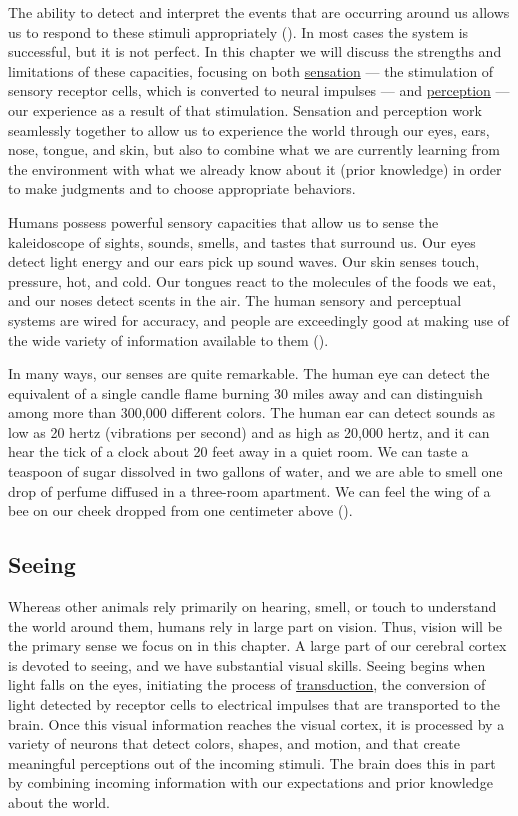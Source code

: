 \documentclass[
]{krantz}
\begin{document}
The ability to detect and interpret the events that are occurring around us allows us to respond to these stimuli appropriately (). In most cases the system is successful, but it is not perfect. In this chapter we will discuss the strengths and limitations of these capacities, focusing on both \hyperref[sensation]{sensation} --- the stimulation of sensory receptor cells, which is converted to neural impulses --- and \hyperref[perception]{perception} --- our experience as a result of that stimulation. Sensation and perception work seamlessly together to allow us to experience the world through our eyes, ears, nose, tongue, and skin, but also to combine what we are currently learning from the environment with what we already know about it (prior knowledge) in order to make judgments and to choose appropriate behaviors.

Humans possess powerful sensory capacities that allow us to sense the kaleidoscope of sights, sounds, smells, and tastes that surround us. Our eyes detect light energy and our ears pick up sound waves. Our skin senses touch, pressure, hot, and cold. Our tongues react to the molecules of the foods we eat, and our noses detect scents in the air. The human sensory and perceptual systems are wired for accuracy, and people are exceedingly good at making use of the wide variety of information available to them ().

In many ways, our senses are quite remarkable. The human eye can detect the equivalent of a single candle flame burning 30 miles away and can distinguish among more than 300,000 different colors. The human ear can detect sounds as low as 20 hertz (vibrations per second) and as high as 20,000 hertz, and it can hear the tick of a clock about 20 feet away in a quiet room. We can taste a teaspoon of sugar dissolved in two gallons of water, and we are able to smell one drop of perfume diffused in a three-room apartment. We can feel the wing of a bee on our cheek dropped from one centimeter above ().

\subsection*{Seeing}\label{seeing}


Whereas other animals rely primarily on hearing, smell, or touch to understand the world around them, humans rely in large part on vision. Thus, vision will be the primary sense we focus on in this chapter. A large part of our cerebral cortex is devoted to seeing, and we have substantial visual skills. Seeing begins when light falls on the eyes, initiating the process of \hyperref[transduction]{transduction}, the conversion of light detected by receptor cells to electrical impulses that are transported to the brain. Once this visual information reaches the visual cortex, it is processed by a variety of neurons that detect colors, shapes, and motion, and that create meaningful perceptions out of the incoming stimuli. The brain does this in part by combining incoming information with our expectations and prior knowledge about the world.
\end{document}
